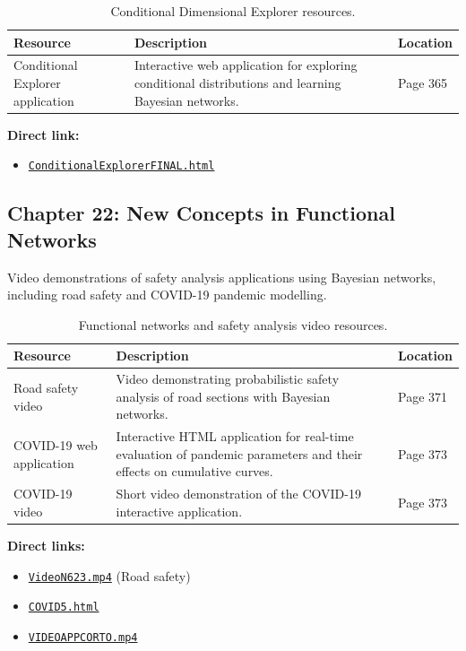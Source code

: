 \begin{table}[H]
\centering
\caption{Conditional Dimensional Explorer resources.}
\begin{tabular}{p{3.5cm}p{8cm}p{2.5cm}}
\toprule
\textbf{Resource} & \textbf{Description} & \textbf{Location} \\
\midrule
Conditional Explorer application & Interactive web application for exploring conditional distributions and learning Bayesian networks. & Page 365 \\
\bottomrule
\end{tabular}
\end{table}

\noindent
\textbf{Direct link:}
\begin{itemize}
    \item \href{https://enriquecastilloron.github.io/mi-libro-interactivo/apps/ConditionalExplorerFINAL.html}{\nolinkurl{ConditionalExplorerFINAL.html}}
\end{itemize}

\subsection{Chapter 22: New Concepts in Functional Networks}

Video demonstrations of safety analysis applications using Bayesian networks, including road safety and COVID-19 pandemic modelling.

\begin{table}[H]
\centering
\caption{Functional networks and safety analysis video resources.}
\begin{tabular}{p{3.5cm}p{8cm}p{2.5cm}}
\toprule
\textbf{Resource} & \textbf{Description} & \textbf{Location} \\
\midrule
Road safety video & Video demonstrating probabilistic safety analysis of road sections with Bayesian networks. & Page 371 \\
COVID-19 web application & Interactive HTML application for real-time evaluation of pandemic parameters and their effects on cumulative curves. & Page 373 \\
COVID-19 video & Short video demonstration of the COVID-19 interactive application. & Page 373 \\
\bottomrule
\end{tabular}
\end{table}

\noindent
\textbf{Direct links:}
\begin{itemize}
    \item \href{https://raw.githubusercontent.com/EnriqueCastilloRon/mi-libro-interactivo/main/videos/VideoN623.mp4}{\nolinkurl{VideoN623.mp4}} (Road safety)
    \item \href{https://enriquecastilloron.github.io/PRUEBA/COVID5.html}{\nolinkurl{COVID5.html}}
    \item \href{https://enriquecastilloron.github.io/PRUEBA/VIDEOAPPCORTO.mp4}{\nolinkurl{VIDEOAPPCORTO.mp4}}
\end{itemize}

